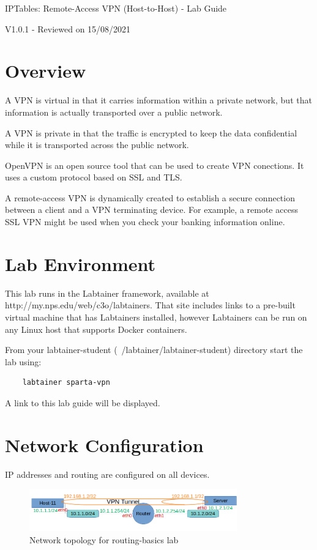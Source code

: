


\begin{center}
{\LARGE IPTables: Remote-Access VPN (Host-to-Host) - Lab Guide}

V1.0.1 - Reviewed on 15/08/2021
\vspace{0.1in}\\
\end{center}

\copyrightnotice

\section{Overview}
A VPN is virtual in that it carries information within a private network, but that information is actually transported over a public network.

A VPN is private in that the traffic is encrypted to keep the data confidential while it is transported across the public network.

OpenVPN is an open source tool that can be used to create VPN conections. It uses a custom protocol based on SSL and TLS.

A remote-access VPN is dynamically created to establish a secure connection between a client and a VPN terminating device. For example, a remote access SSL VPN might be used when you check your banking information online.

\section{Lab Environment}
This lab runs in the Labtainer framework,
available at http://my.nps.edu/web/c3o/labtainers.
That site includes links to a pre-built virtual machine
that has Labtainers installed, however Labtainers can
be run on any Linux host that supports Docker containers.

From your labtainer-student (~/labtainer/labtainer-student) directory start the lab using:
\begin{verbatim}
    labtainer sparta-vpn
\end{verbatim}
\noindent A link to this lab guide will be displayed.

\section{Network Configuration}
IP addresses and routing are configured on all devices.

\begin{figure}[H]
\begin{center}
\includegraphics [width=0.8\textwidth]{labtainers-vpn1-lab-01.png}
\end{center}
\caption{Network topology for routing-basics lab}
\label{fig:topology}
\end{figure}

